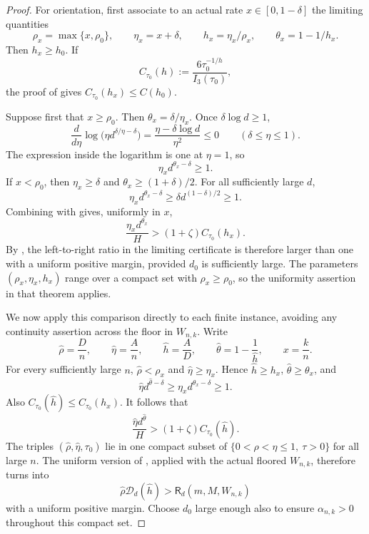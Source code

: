 \documentclass[11pt,letterpaper]{article}
\theoremstyle{definition}
\begin{document}
\begin{proof}
For orientation, first associate to an actual rate $x\in[0,1-\delta]$ the
limiting quantities
\[
  \rho _x=\max\{x,\rho_0\},\qquad
  \eta_x=x+\delta,\qquad
  h_x=\eta_x/\rho _x,\qquad
  \theta_x=1-1/h_x.
\]
Then $h_x\geq h_0$. If
\[
  C_{\tau_0}(h):=\frac{6\tau_0^{-1/h}}{I_3(\tau_0)},
\]
the proof of  gives
$C_{\tau_0}(h_x)\leq C(h_0)$.

Suppose first that $x\geq\rho_0$. Then
$\theta_x=\delta/\eta_x$. Once $\delta\log d\geq1$,
\[
  \frac{d}{d\eta}
  \log\bigl(\eta d^{\delta/\eta-\delta}\bigr)
  =\frac{\eta-\delta\log d}{\eta^2}\leq0
  \qquad(\delta\leq\eta\leq1).
\]
The expression inside the logarithm is one at $\eta=1$, so
\begin{equation}
  \eta_xd^{\theta_x-\delta}\geq1.
  \label{eq:boundary-unpadded-uniform}
\end{equation}
If $x<\rho_0$, then $\eta_x\geq\delta$ and
$\theta_x\geq(1+\delta)/2$. For all sufficiently large $d$,
\begin{equation}
  \eta_xd^{\theta_x-\delta}
  \geq\delta d^{(1-\delta)/2}\geq1.
  \label{eq:boundary-padded-uniform}
\end{equation}
Combining  with
 gives,
uniformly in $x$,
\[
  \frac{\eta_xd^{\theta_x}}H
  >(1+\zeta)C_{\tau_0}(h_x).
\]
By , the left-to-right ratio in the limiting
certificate is therefore larger than one with a uniform positive margin,
provided $d_0$ is sufficiently large. The parameters
$(\rho _x,\eta_x,h_x)$ range over a compact set with $\rho _x\geq\rho_0$, so the
uniformity assertion in that theorem applies.

We now apply this comparison directly to each finite instance, avoiding any
continuity assertion across the floor in $W_{n,k}$. Write
\[
  \widehat \rho =\frac Dn,
  \qquad
  \widehat\eta=\frac An,
  \qquad
  \widehat h=\frac AD,
  \qquad
  \widehat\theta=1-\frac1{\widehat h},
  \qquad x=\frac kn.
\]
For every sufficiently large $n$,
$\widehat \rho <\rho _x$ and $\widehat\eta\geq\eta_x$. Hence
$\widehat h\geq h_x$, $\widehat\theta\geq\theta_x$, and
\[
  \widehat\eta d^{\widehat\theta-\delta}
  \geq\eta_xd^{\theta_x-\delta}\geq1.
\]
Also $C_{\tau_0}(\widehat h)\leq C_{\tau_0}(h_x)$. It follows that
\begin{equation}
  \frac{\widehat\eta d^{\widehat\theta}}H
  >(1+\zeta)C_{\tau_0}(\widehat h).
  \label{eq:boundary-finite-leading-margin}
\end{equation}
The triples $(\widehat \rho ,\widehat\eta,\tau_0)$ lie in one compact subset of
$\{0<\rho <\eta\leq1,\ \tau>0\}$ for all large $n$. The uniform version of
, applied with the actual floored
$W_{n,k}$, therefore turns  into
\[
  \widehat \rho \mathscr D_d(\widehat h)
  >\mathsf R_d(m,M,W_{n,k})
\]
with a uniform positive margin. Choose $d_0$ large enough also to ensure
$\alpha_{n,k}>0$ throughout this compact set.


\end{proof}
\end{document}
